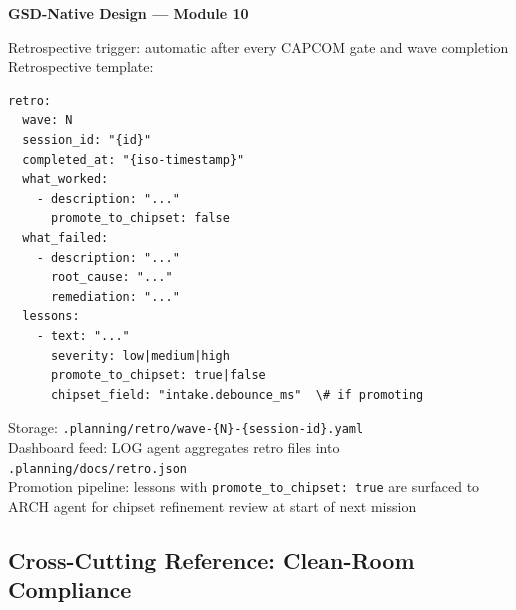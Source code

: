 \documentclass[11pt,letterpaper]{article}
\begin{document}
\begin{implbox}
\textbf{GSD-Native Design --- Module 10}

Retrospective trigger: automatic after every CAPCOM gate and wave completion\\
Retrospective template:
\begin{verbatim}
retro:
  wave: N
  session_id: "{id}"
  completed_at: "{iso-timestamp}"
  what_worked:
    - description: "..."
      promote_to_chipset: false
  what_failed:
    - description: "..."
      root_cause: "..."
      remediation: "..."
  lessons:
    - text: "..."
      severity: low|medium|high
      promote_to_chipset: true|false
      chipset_field: "intake.debounce_ms"  \# if promoting
\end{verbatim}

Storage: \texttt{.planning/retro/wave-\{N\}-\{session-id\}.yaml}\\
Dashboard feed: LOG agent aggregates retro files into \texttt{.planning/docs/retro.json}\\
Promotion pipeline: lessons with \texttt{promote\_to\_chipset: true} are surfaced to ARCH agent for chipset refinement review at start of next mission
\end{implbox}

\subsection{Cross-Cutting Reference: Clean-Room Compliance}
\end{document}
